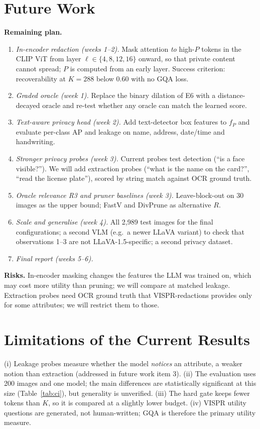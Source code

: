\documentclass[10pt]{article}
\newcommand{\R}{R}
\renewcommand{\Pr}{P}
\begin{document}
\section{Future Work}
\textbf{Remaining plan.}
\begin{enumerate}
\item \emph{In-encoder redaction (weeks 1--2).} Mask attention \emph{to} high-$\Pr$ tokens in the CLIP ViT from layer $\ell\in\{4,8,12,16\}$ onward, so that private content cannot spread; $\Pr$ is computed from an early layer. Success criterion: recoverability at $K{=}288$ below 0.60 with no GQA loss.
\item \emph{Graded oracle (week 1).} Replace the binary dilation of E6 with a distance-decayed oracle and re-test whether any oracle can match the learned score.
\item \emph{Text-aware privacy head (week 2).} Add text-detector box features to $f_P$ and evaluate per-class AP and leakage on name, address, date/time and handwriting.
\item \emph{Stronger privacy probes (week 3).} Current probes test detection (``is a face visible?''). We will add extraction probes (``what is the name on the card?'', ``read the license plate''), scored by string match against OCR ground truth.
\item \emph{Oracle relevance R3 and pruner baselines (week 3).} Leave-block-out on 30 images as the upper bound; FastV and DivPrune as alternative $\R$.
\item \emph{Scale and generalise (week 4).} All 2,989 test images for the final configurations; a second VLM (e.g.\ a newer LLaVA variant) to check that observations 1--3 are not LLaVA-1.5-specific; a second privacy dataset.
\item \emph{Final report (weeks 5--6).}
\end{enumerate}
\textbf{Risks.} In-encoder masking changes the features the LLM was trained on, which may cost more utility than pruning; we will compare at matched leakage.
Extraction probes need OCR ground truth that VISPR-redactions provides only for some attributes; we will restrict them to those.

\section{Limitations of the Current Results}
(i) Leakage probes measure whether the model \emph{notices} an attribute, a weaker notion than extraction (addressed in future work item 3).
(ii) The evaluation uses 200 images and one model; the main differences are statistically significant at this size (Table~\ref{tab:ci}), but generality is unverified.
(iii) The hard gate keeps fewer tokens than $K$, so it is compared at a slightly lower budget.
(iv) VISPR utility questions are generated, not human-written; GQA is therefore the primary utility measure.

{\footnotesize
\setlength{\bibsep}{1pt}


}
\end{document}

